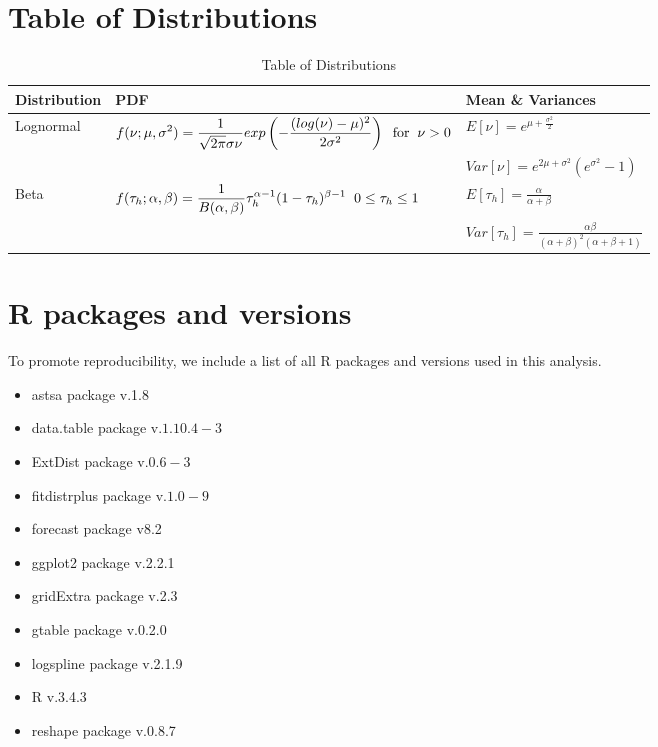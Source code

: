 \documentclass[oneside,12pt,final]{sty/ucthesis-CA2012}
\let\cite\citep                             %
\begin{document}
\begin{mainmatter}
 
\section{Table of Distributions}

\begin{table}
\caption{Table of Distributions}
\begin{tabular}{l|l|l}
  \hline \small
 Distribution & PDF & Mean \& Variances \\ 
   \hline
   Lognormal & \(\displaystyle f(\nu;\mu,\sigma^2) = \frac{1}{\sqrt{2\pi}\sigma \nu}exp\left( -\frac{(log(\nu)-\mu)^2}{2\sigma^2} \right) \hspace{2mm} \text{for} \hspace{2mm} \nu > 0 \) & \(\displaystyle E[\nu] = e^{\mu + \frac{\sigma^2}{2}} \) \\
      & &  \(\displaystyle Var[\nu] =  e^{2\mu + \sigma^2}(e^{\sigma^2} - 1) \) \\
   \hline
   Beta & \(\displaystyle f(\tau_{h};\alpha,\beta) = \frac{1}{B(\alpha, \beta)} \tau_{h}^{\alpha -1} (1-\tau_{h})^{\beta -1}  \hspace{2mm} 0 \leq \tau_{h} \leq 1   \) &  \(\displaystyle E[\tau_{h}] = \frac{\alpha}{\alpha + \beta} \) \\
	   & &  \(\displaystyle Var[{\tau_{h}}] = \frac{\alpha\beta}{(\alpha + \beta)^2(\alpha + \beta + 1)} \) \\
   \hline
\end{tabular} 
\label{distributions}
\end{table}

\newpage

\section{R packages and versions}
To promote reproducibility, we include a list of all R packages and versions used in this analysis.

\begin{itemize}
\item astsa package v.1.8 \cite{astsa}
\item data.table package v.$1.10.4-3$  \cite{datatable}
\item ExtDist package v.$0.6-3$ \cite{extdist}
\item fitdistrplus package v.$1.0-9$ \cite{fitdistrplus}
\item forecast package v8.2 \cite{forecast1, forecast2} 
\item ggplot2 package v.2.2.1 \cite{ggplot}
\item gridExtra package v.2.3 \cite{gridextra}
\item gtable package v.0.2.0 \cite{gtable}
\item logspline package v.2.1.9 \cite{logspline}
\item R v.3.4.3 \cite{Rcite} 
\item reshape package v.0.8.7 \cite{reshape}
\end{itemize}



\end{mainmatter}
\end{document}
